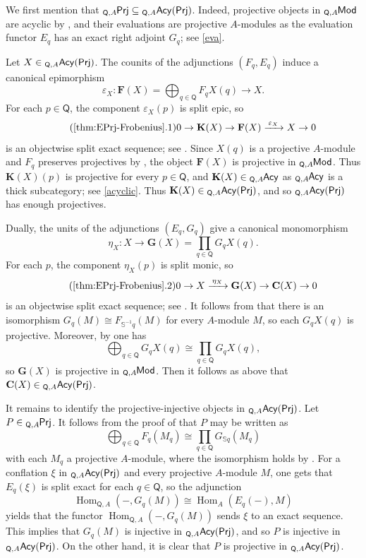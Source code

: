 \documentclass{amsart}
\theoremstyle{bfupright head,slanted body}
\theoremstyle{bfupright head,upright body}
\theoremstyle{fixed bf head,slanted body}
\theoremstyle{fixed bf head,upright body}
\theoremstyle{numbered paragraph}
\newenvironment{prf*}[1][Proof]{%
	\begin{proof}[\bf #1]
		\setcounter{equation}{0}
		\renewcommand{\theequation}{\arabic{equation}}}
	{\end{proof}
}
\numberwithin{equation}{res}
\newcommand{\AcQ}{{}_{\Q,A}\mathsf{Acy}(\sf Prj)}
\newcommand{\xra}[2][]{\xrightarrow[#1]{\:#2\:}}
\newcommand{\Hom}{\operatorname{Hom}}
\newcommand{\Q}{\mathsf{Q}}
\newcommand{\is}{\cong}
\newcommand{\lMod}[1]{{}_{#1}\mspace{-1mu}{\sf{Mod}}}
\newcommand{\lE}[1]{{}_{#1}\mspace{-1mu}{\sf{Acy}}}
\newcommand{\lPrj}[1]{{}_{#1}\mspace{-1mu}{\sf{Prj}}}
\begin{document}
\begin{prf*}
We first mention that $\lPrj{\Q,A}\subseteq\AcQ$. Indeed, projective objects in $\lMod{\Q,A}$ are acyclic by \cite[Theorems 7.1 and 7.29]{HJ22}, and their evaluations are projective $A$-modules as the evaluation functor $E_q$ has an exact right adjoint $G_q$; see \ref{eva}.

Let $X\in\AcQ$. The counits of the adjunctions $(F_q, E_q)$ induce a canonical epimorphism
$$\varepsilon_X:\mathbf F(X)=\bigoplus_{q\in\Q}F_qX(q)\to X.$$
For each $p\in\Q$, the component $\varepsilon_X(p)$ is split epic, so
\begin{equation}\tag{\ref{thm:EPrj-Frobenius}.1}\label{eq:F-approx}
0\to\mathbf K(X)\to\mathbf F(X)
\xra{\varepsilon_X}X\to0
\end{equation}
is an objectwise split exact sequence; see \cite[Proposition 5.7]{HJ24}. Since $X(q)$ is a projective $A$-module and
$F_q$ preserves projectives by \cite[Lemma 3.11]{HJ22}, the object $\mathbf F(X)$ is projective in $\lMod{\Q,A}$. Thus
$\mathbf K(X)(p)$ is projective for every $p\in\Q$, and $\mathbf K(X)\in\lE{\Q,A}$ as $\lE{\Q,A}$ is a thick subcategory; see \ref{acyclic}. Thus $\mathbf K(X)\in\AcQ$, and so $\AcQ$ has enough projectives.

Dually, the units of the adjunctions $(E_q, G_q)$ give a canonical monomorphism
$$\eta_X: X\to
\mathbf G(X)=\prod_{q\in\Q}G_qX(q).$$
For each $p$, the component $\eta_X(p)$ is split monic, so
\begin{equation}\tag{\ref{thm:EPrj-Frobenius}.2}\label{eq:G-approx}
0\to X\xra{\eta_X}\mathbf G(X)
\to\mathbf C(X)\to0
\end{equation}
is an objectwise split exact sequence; see \cite[Proposition 5.7]{HJ24}. It follows from \cite[Lemma 3.4]{HJ24} that there is an isomorphism $G_q(M)\cong F_{\mathbb S^{-1}q}(M)$ for every $A$-module $M$, so each $G_qX(q)$ is projective.
Moreover, by \cite[Proposition 3.7]{HJ24} one has
$$\bigoplus_{q\in\Q}G_qX(q)\is
\prod_{q\in\Q}G_qX(q),$$
so $\mathbf G(X)$ is projective in $\lMod{\Q,A}$. Then it follows as above that $\mathbf C(X)\in\AcQ$.

It remains to identify the projective-injective objects in $\AcQ$. Let $P\in\lPrj{\Q,A}$. It follows from the proof of \cite[Theorem 7.29(a)]{HJ22} that $P$ may be written as
$$\bigoplus_{q\in\Q}F_q(M_q)\is\prod_{q\in\Q}G_{\mathbb S q}(M_q)$$
with each $M_q$ a projective $A$-module, where the isomorphism holds by \cite[Lemma 3.4 and Proposition 3.7]{HJ24}. For a conflation $\xi$ in $\AcQ$ and every projective $A$-module $M$, one gets that $E_q(\xi)$ is split exact for each $q\in\Q$, so the adjunction
$$\Hom_{\Q,A}(-,G_q(M))\cong\Hom_A(E_q(-),M)$$
yields that the functor $\Hom_{\Q,A}(-,G_q(M))$ sends $\xi$ to an exact sequence. This implies that $G_q(M)$ is injective in $\AcQ$, and so $P$ is injective in $\AcQ$. On the other hand, it is clear that $P$ is projective in $\AcQ$.


\end{prf*}
\end{document}
